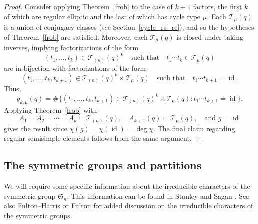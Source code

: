\documentclass[10pt]{article}
\theoremstyle{definition}
\DeclareMathOperator{\id}{id}
\newcommand{\FS}{\mathfrak{S}}
\newcommand{\CT}{\mathcal{T}}
\begin{document}
\begin{proof}
Consider applying Theorem~\ref{frob} to the case of \(k+1\) factors, the first \(k\) of which are regular elliptic and the last of which has cycle type \(\mu\).
Each \(\CT_\mu (q)\) is a union of conjugacy classes (see Section~\ref{cycle_rs_re}), and so the hypotheses of Theorem~\ref{frob} are satisfied.
Moreover, each \(\CT_\mu (q)\) is closed under taking inverses, implying factorizations of the form
\[
(t_1,\ldots,t_k) \in \CT_{(n)}(q)^k
\quad
\text{such that}
\quad
t_1 \cdots t_k \in \CT_\mu (q)
\]
are in bijection with factorizations of the form
\[
(t_1,\ldots,t_k,t_{k+1}) \in \CT_{(n)}(q)^k \times \CT_\mu (q)
\quad
\text{such that}
\quad
t_1 \cdots t_{k+1} = \id.
\]
Thus,
\[
g_{k,\mu} (q)
=
\# \{ (t_1,\ldots,t_k,t_{k+1}) \in \CT_{(n)} (q)^k \times \CT_\mu (q) : t_1 \cdots t_{k+1} = \id \}.
\]
Applying Theorem~\ref{frob} with
\[
A_1 = A_2 = \cdots = A_k = \CT_{(n)}(q), \quad A_{k+1} (q) = \CT_\mu (q), \quad \text{and } g = \id
\]
gives the result
since \(\chi(g) = \chi(\id) = \deg \chi\).
The final claim regarding regular semisimple elements follows from the same argument.
\end{proof}


































\subsection{The symmetric groups and partitions}

We will require some specific information about the irreducible characters of the symmetric group \(\FS_n\).
This information can be found in Stanley \cite{EC2} and Sagan \cite{sagan}. See also Fulton--Harris \cite{FH} or Fulton \cite{fulton} for added discussion on the irreducible characters of the symmetric groups.
\end{document}
